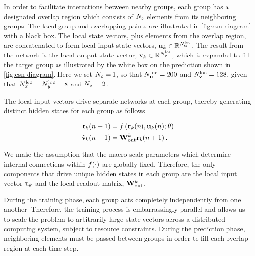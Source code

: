 In order to facilitate interactions between nearby groups, each group
has a designated overlap region which consists of $N_{o}$ elements
from its neighboring groups.
The local group and overlapping points are illustrated in \cref{fig:esn-diagram}
with a black box.
The local state vectors, plus elements from the overlap region, are concatenated
to form local input state vectors,
$\mathbf{u}_{k}\in\mathbb{R}^{N_{\mathbf{u}}^\text{loc}}$.
The result from the network is the local output state vector,
$\mathbf{v}_{k}\in\mathbb{R}^{N_{\mathbf{v}}^\text{loc}}$,
which is expanded to fill the target group as illustrated by the
white box on the prediction shown in \cref{fig:esn-diagram}.
Here we set $N_{o}=1$, so that $N_{\mathbf{u}}^\text{loc}=200$ and
$N_{\mathbf{v}}^\text{loc}=128$, given that $N_{x}^\text{loc}=N_{y}^\text{loc}=8$ and $N_{z}=2$.

The local input vectors drive separate networks at each group, thereby generating
distinct hidden states for each group as follows
\begin{linenomath*}\begin{equation}
    \begin{aligned}
        \mathbf{r}_{k}(n+1)
        &= f\left(
            \mathbf{r}_{k}(n), \mathbf{u}_{k}(n); \bm{\theta}
        \right) \\
        \hat{\mathbf{v}}_{k}(n+1)
        &= \mathbf{W}_\text{out}^{k} \mathbf{r}_{k}(n+1) \, .
    \end{aligned}
    \label{eq:local-rnn}
\end{equation}\end{linenomath*}
We make the assumption that the macro-scale parameters which determine internal
connections within $f(\cdot)$ are globally fixed.
Therefore, the only components
that drive unique hidden states in each group are the local input vector
$\mathbf{u}_{k}$ and the local readout matrix, $\mathbf{W}_\text{out}^{k}$.

During the training phase, each group acts completely independently from one
another.
Therefore, the training process is embarrassingly parallel and allows us to
scale the problem to arbitrarily large state vectors across a distributed
computing system, subject to resource constraints.
During the prediction phase, neighboring elements must be passed between
groups in order to fill each overlap region at each time step.

